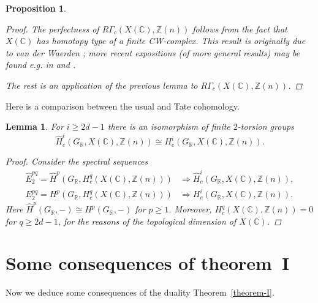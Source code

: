 \documentclass[leqno,12pt]{article}
\theoremstyle{plain}
\newtheorem{lemma}[theorem]{\indent\sc Lemma}
\newtheorem{proposition}[theorem]{\indent\sc Proposition}
\theoremstyle{definition}
\newcommand{\CC}{\mathbb{C}}
\newcommand{\RR}{\mathbb{R}}
\newcommand{\ZZ}{\mathbb{Z}}
\begin{document}
\begin{proposition}
  \begin{proof}
    The perfectness of $R\Gamma_c (X (\CC), \ZZ (n))$ follows from the fact that
    $X (\CC)$ has homotopy type of a finite CW-complex. This result is
    originally due to van der Waerden \cite{van-der-Waerden-30}; more recent
    expositions (of more general results) may be found e.g. in
    \cite{Lojasiewicz-1964} and \cite{Hironaka-1974}.

    The rest is an application of the previous lemma to
    $R\Gamma_c (X(\CC), \ZZ(n))$.
  \end{proof}
\end{proposition}

Here is a comparison between the usual and Tate cohomology.

\begin{lemma}
  \label{lemma:Tate-vs-normal-cohomology-of-X(C)}
  For $i \ge 2d - 1$ there is an isomorphism of finite $2$-torsion groups
  \[ \widehat{H}^i_c (G_\RR, X (\CC), \ZZ(n)) \cong
    H^i_c (G_\RR, X (\CC), \ZZ(n)). \]

  \begin{proof}
    Consider the spectral sequences
    \begin{align*}
      \widehat{E}^{pq}_2 = \widehat{H}^p (G_\RR, H^q_c (X (\CC), \ZZ(n))) & \Longrightarrow
      \widehat{H}^i_c (G_\RR, X (\CC), \ZZ(n)), \\
      E^{pq}_2 = H^p (G_\RR, H^q_c (X (\CC), \ZZ(n))) & \Longrightarrow
      H^i_c (G_\RR, X (\CC), \ZZ(n)).
    \end{align*}
    Here $\widehat{H}^p (G_\RR, -) \cong H^p (G_\RR, -)$ for
    $p \ge 1$. Moreover, $H^q_c (X (\CC), \ZZ(n)) = 0$ for $q \ge 2d-1$, for the
    reasons of the topological dimension of $X (\CC)$.
  \end{proof}
\end{lemma}


\section{Some consequences of theorem~I}
\label{sec:consequences-of-theorem-I}

Now we deduce some consequences of the duality Theorem~\ref{theorem-I}.
\end{document}
